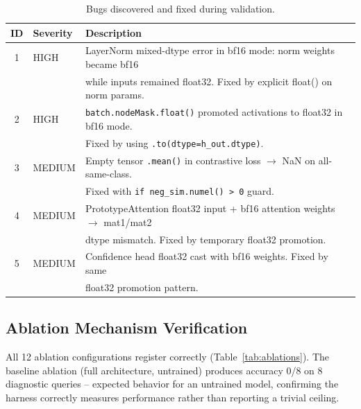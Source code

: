 \documentclass{article}
\begin{document}
\begin{table}[h]
\centering
\caption{Bugs discovered and fixed during validation.}
\label{tab:bugs}
\begin{tabular}{clp{7cm}}
\toprule
\textbf{ID} & \textbf{Severity} & \textbf{Description} \\
\midrule
1 & HIGH & LayerNorm mixed-dtype error in bf16 mode: norm weights became bf16\\
  & & while inputs remained float32. Fixed by explicit float() on norm params. \\
2 & HIGH & \texttt{batch.nodeMask.float()} promoted activations to float32 in bf16 mode.\\
  & & Fixed by using \texttt{.to(dtype=h\_out.dtype)}. \\
3 & MEDIUM & Empty tensor \texttt{.mean()} in contrastive loss $\to$ NaN on all-same-class.\\
  & & Fixed with \texttt{if neg\_sim.numel() > 0} guard. \\
4 & MEDIUM & PrototypeAttention float32 input + bf16 attention weights $\to$ mat1/mat2\\
  & & dtype mismatch. Fixed by temporary float32 promotion. \\
5 & MEDIUM & Confidence head float32 cast with bf16 weights. Fixed by same\\
  & & float32 promotion pattern. \\
\bottomrule
\end{tabular}
\end{table}

\subsection{Ablation Mechanism Verification}

All 12 ablation configurations register correctly (Table~\ref{tab:ablations}). The
baseline ablation (full architecture, untrained) produces accuracy 0/8 on 8
diagnostic queries -- expected behavior for an untrained model, confirming the
harness correctly measures performance rather than reporting a trivial ceiling.
\end{document}
